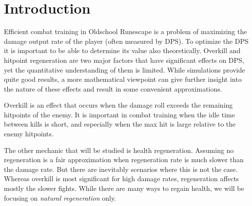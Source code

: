 \section{Introduction}
Efficient combat training in Oldschool Runescape is a problem of maximizing the damage output rate of the player (often measured by DPS). To optimize the DPS it is important to be able to determine its value also theoretically. Overkill and hitpoint regeneration are two major factors that have significant effects on DPS, yet the quantitative understanding of them is limited.
While simulations provide quite good results, a more mathematical viewpoint can give further insight into the nature of these effects and result in some convenient approximations.

Overkill is an effect that occurs when the damage roll exceeds the remaining hitpoints of the enemy. It is important in combat training when the idle time between kills is short, and especially when the max hit is large relative to the enemy hitpoints.

The other mechanic that will be studied is health regeneration. Assuming no regeneration is a fair approximation when regeneration rate is much slower than the damage rate. But there are inevitably scenarios where this is not the case. Whereas overkill is most significant for high damage rates, regeneration affects mostly the slower fights. While there are many ways to regain health, we will be focusing on \textit{natural regeneration} only.
